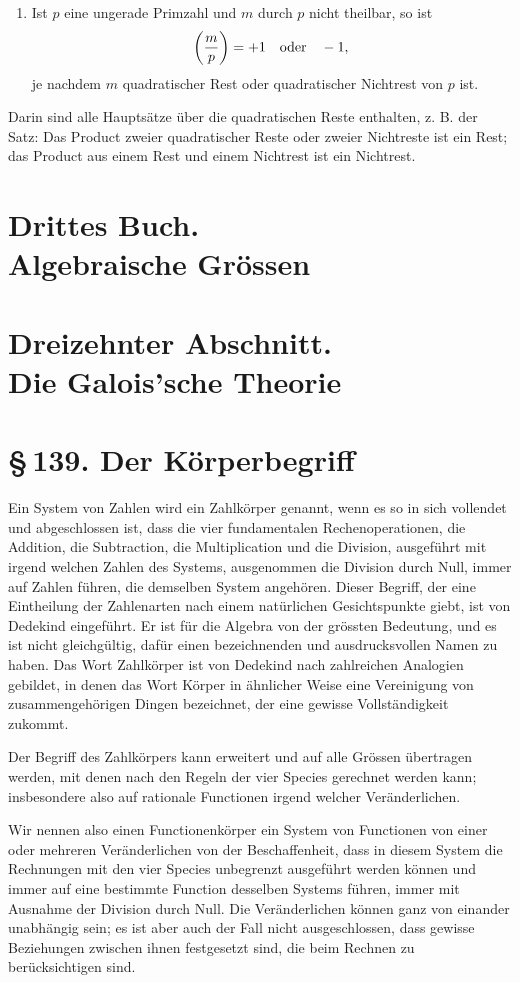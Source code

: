 \documentclass[11pt]{article}
\providecommand{\sect}[2]{\section*{\S\,#1. #2}}
\begin{document}
\begin{enumerate}[label=\arabic*.,leftmargin=2em,start=11]
\item Ist $p$ eine ungerade Primzahl und $m$ durch $p$ nicht theilbar, so ist
\[
        \left(\frac mp\right)=+1\quad\hbox{oder}\quad -1,
\]
je nachdem $m$ quadratischer Rest oder quadratischer Nichtrest von $p$ ist.
\end{enumerate}

Darin sind alle Hauptsätze über die quadratischen Reste enthalten, z. B. der Satz: Das Product zweier quadratischer Reste oder zweier Nichtreste ist ein Rest; das Product aus einem Rest und einem Nichtrest ist ein Nichtrest.

\section*{Drittes Buch.\\Algebraische Grössen}

\section*{Dreizehnter Abschnitt.\\Die Galois'sche Theorie}

\sect{139}{Der Körperbegriff}

Ein System von Zahlen wird ein Zahlkörper genannt, wenn es so in sich vollendet und abgeschlossen ist, dass die vier fundamentalen Rechenoperationen, die Addition, die Subtraction, die Multiplication und die Division, ausgeführt mit irgend welchen Zahlen des Systems, ausgenommen die Division durch Null, immer auf Zahlen führen, die demselben System angehören. Dieser Begriff, der eine Eintheilung der Zahlenarten nach einem natürlichen Gesichtspunkte giebt, ist von Dedekind eingeführt. Er ist für die Algebra von der grössten Bedeutung, und es ist nicht gleichgültig, dafür einen bezeichnenden und ausdrucksvollen Namen zu haben. Das Wort Zahlkörper ist von Dedekind nach zahlreichen Analogien gebildet, in denen das Wort Körper in ähnlicher Weise eine Vereinigung von zusammengehörigen Dingen bezeichnet, der eine gewisse Vollständigkeit zukommt.

Der Begriff des Zahlkörpers kann erweitert und auf alle Grössen übertragen werden, mit denen nach den Regeln der vier Species gerechnet werden kann; insbesondere also auf rationale Functionen irgend welcher Veränderlichen.

Wir nennen also einen Functionenkörper ein System von Functionen von einer oder mehreren Veränderlichen von der Beschaffenheit, dass in diesem System die Rechnungen mit den vier Species unbegrenzt ausgeführt werden können und immer auf eine bestimmte Function desselben Systems führen, immer mit Ausnahme der Division durch Null. Die Veränderlichen können ganz von einander unabhängig sein; es ist aber auch der Fall nicht ausgeschlossen, dass gewisse Beziehungen zwischen ihnen festgesetzt sind, die beim Rechnen zu berücksichtigen sind.
\end{document}
